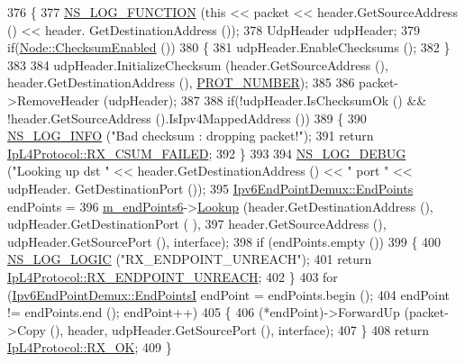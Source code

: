 \begin{DoxyCode}
376 \{
377   \hyperlink{log-macros-disabled_8h_a90b90d5bad1f39cb1b64923ea94c0761}{NS\_LOG\_FUNCTION} (\textcolor{keyword}{this} << packet << header.GetSourceAddress () << header.
      GetDestinationAddress ());
378   UdpHeader udpHeader;
379   \textcolor{keywordflow}{if}(\hyperlink{classns3_1_1Node_a0515bfe9a3aeb6605d657ba855699815}{Node::ChecksumEnabled} ())
380     \{
381       udpHeader.EnableChecksums ();
382     \}
383 
384   udpHeader.InitializeChecksum (header.GetSourceAddress (), header.GetDestinationAddress (), 
      \hyperlink{classns3_1_1UdpL4Protocol_ad370801b3d1a166e831020a777c41047}{PROT\_NUMBER});
385 
386   packet->RemoveHeader (udpHeader);
387 
388   \textcolor{keywordflow}{if}(!udpHeader.IsChecksumOk () && !header.GetSourceAddress ().IsIpv4MappedAddress ())
389     \{
390       \hyperlink{group__logging_gafbd73ee2cf9f26b319f49086d8e860fb}{NS\_LOG\_INFO} (\textcolor{stringliteral}{"Bad checksum : dropping packet!"});
391       \textcolor{keywordflow}{return} \hyperlink{classns3_1_1IpL4Protocol_afd3744c89902fff232e2fd45f558c80eaba0111c02656760e18ca30479e297b07}{IpL4Protocol::RX\_CSUM\_FAILED};
392     \}
393 
394   \hyperlink{group__logging_ga413f1886406d49f59a6a0a89b77b4d0a}{NS\_LOG\_DEBUG} (\textcolor{stringliteral}{"Looking up dst "} << header.GetDestinationAddress () << \textcolor{stringliteral}{" port "} << udpHeader.
      GetDestinationPort ()); 
395   \hyperlink{classns3_1_1Ipv6EndPointDemux_a40c1d59189759e1e7f5cabe7cd01c0fa}{Ipv6EndPointDemux::EndPoints} endPoints =
396     \hyperlink{classns3_1_1UdpL4Protocol_a30ee62ced3762babc55527297cbff077}{m\_endPoints6}->\hyperlink{classns3_1_1Ipv6EndPointDemux_a14fd788471bcde832d3f125bdfabc24b}{Lookup} (header.GetDestinationAddress (), udpHeader.GetDestinationPort (
      ),
397                          header.GetSourceAddress (), udpHeader.GetSourcePort (), interface);
398   \textcolor{keywordflow}{if} (endPoints.empty ())
399     \{
400       \hyperlink{group__logging_ga88acd260151caf2db9c0fc84997f45ce}{NS\_LOG\_LOGIC} (\textcolor{stringliteral}{"RX\_ENDPOINT\_UNREACH"});
401       \textcolor{keywordflow}{return} \hyperlink{classns3_1_1IpL4Protocol_afd3744c89902fff232e2fd45f558c80ea00e3d2a534b8bd353395254c0735948b}{IpL4Protocol::RX\_ENDPOINT\_UNREACH};
402     \}
403   \textcolor{keywordflow}{for} (\hyperlink{classns3_1_1Ipv6EndPointDemux_a79d7b69805dbd45a902e5e6b375e752b}{Ipv6EndPointDemux::EndPointsI} endPoint = endPoints.begin ();
404        endPoint != endPoints.end (); endPoint++)
405     \{
406       (*endPoint)->ForwardUp (packet->Copy (), header, udpHeader.GetSourcePort (), interface);
407     \}
408   \textcolor{keywordflow}{return} \hyperlink{classns3_1_1IpL4Protocol_afd3744c89902fff232e2fd45f558c80eabd979bce2f3b22521c81c4115c66317e}{IpL4Protocol::RX\_OK};
409 \}
\end{DoxyCode}


